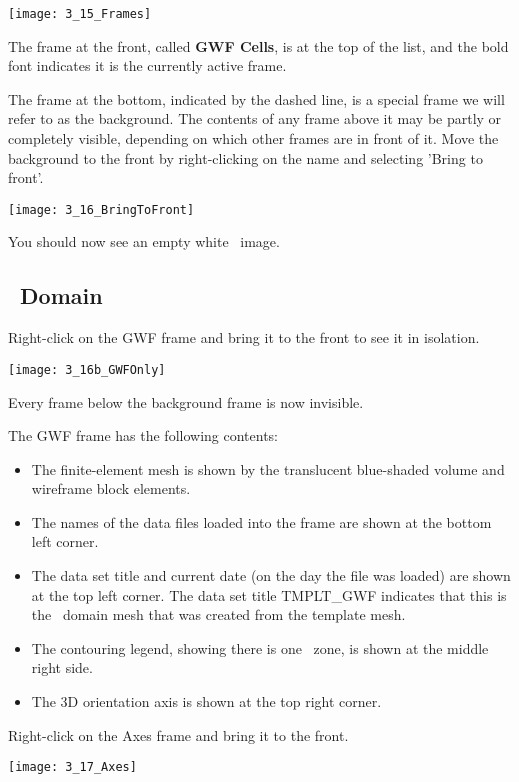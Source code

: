         \texttt{[image: 3\_15\_Frames]}

The frame at the front, called \textbf{GWF Cells}, is at the top of the list, and the bold font indicates it is the currently active frame.

The frame at the bottom, indicated by the dashed line, is a special frame we will refer to as the {\sf background}.  The contents of any frame above it may be partly or completely visible, depending on which other frames are in front of it.  Move the {\sf background} to the front by right-clicking on the name and selecting 'Bring to front'.

        \texttt{[image: 3\_16\_BringToFront]}

You should now see an empty white \tecplot\ image.

\subsection{\gwf\ Domain}
Right-click on the {\sf GWF} frame and bring it to the front to see it in isolation.

        \texttt{[image: 3\_16b\_GWFOnly]}

Every frame below the {\sf background} frame is now invisible.

The {\sf GWF} frame has the following contents:
\begin{itemize}
  \item The finite-element mesh is shown by the translucent blue-shaded volume and wireframe block elements.
  \item The names of the data files loaded into the frame are shown at the bottom left corner.
  \item The data set title and current date (on the day the file was loaded) are shown at the top left corner.  The data set title {\sf TMPLT\_GWF} indicates that this is the \gwf\ domain mesh that was created from the template mesh.
  \item The contouring legend, showing there is one \gwf\ zone, is shown at the middle right side.
  \item The 3D orientation axis is shown at the top right corner.
\end{itemize}

Right-click on the {\sf Axes} frame and bring it to the front.

        \texttt{[image: 3\_17\_Axes]}

